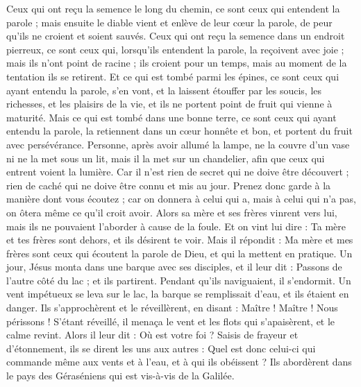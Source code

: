 \begin{multicols}{2}
Ceux qui ont reçu la semence le long du chemin, ce sont ceux qui entendent la parole ; mais ensuite le diable vient et enlève de leur cœur la parole, de peur qu'ils ne croient et soient sauvés.
Ceux qui ont reçu la semence dans un endroit pierreux, ce sont ceux qui, lorsqu'ils entendent la parole, la reçoivent avec joie ; mais ils n'ont point de racine ; ils croient pour un temps, mais au moment de la tentation ils se retirent.
Et ce qui est tombé parmi les épines, ce sont ceux qui ayant entendu la parole, s'en vont, et la laissent étouffer par les soucis, les richesses, et les plaisirs de la vie, et ils ne portent point de fruit qui vienne à maturité.
Mais ce qui est tombé dans une bonne terre, ce sont ceux qui ayant entendu la parole, la retiennent dans un cœur honnête et bon, et portent du fruit avec persévérance.
Personne, après avoir allumé la lampe, ne la couvre d'un vase ni ne la met sous un lit, mais il la met sur un chandelier, afin que ceux qui entrent voient la lumière.
Car il n'est rien de secret qui ne doive être découvert ; rien de caché qui ne doive être connu et mis au jour.
Prenez donc garde à la manière dont vous écoutez ; car on donnera à celui qui a, mais à celui qui n'a pas, on ôtera même ce qu'il croit avoir.
Alors sa mère et ses frères vinrent vers lui, mais ils ne pouvaient l'aborder à cause de la foule.
Et on vint lui dire : Ta mère et tes frères sont dehors, et ils désirent te voir.
Mais il répondit : Ma mère et mes frères sont ceux qui écoutent la parole de Dieu, et qui la mettent en pratique.
Un jour, Jésus monta dans une barque avec ses disciples, et il leur dit : Passons de l'autre côté du lac ; et ils partirent.
Pendant qu'ils naviguaient, il s'endormit. Un vent impétueux se leva sur le lac, la barque se remplissait d'eau, et ils étaient en danger.
Ils s'approchèrent et le réveillèrent, en disant : Maître ! Maître ! Nous périssons ! S'étant réveillé, il menaça le vent et les flots qui s'apaisèrent, et le calme revint.
Alors il leur dit : Où est votre foi ? Saisis de frayeur et d'étonnement, ils se dirent les uns aux autres : Quel est donc celui-ci qui commande même aux vents et à l'eau, et à qui ils obéissent ?
Ils abordèrent dans le pays des Géraséniens qui est vis-à-vis de la Galilée.

\end{multicols}
